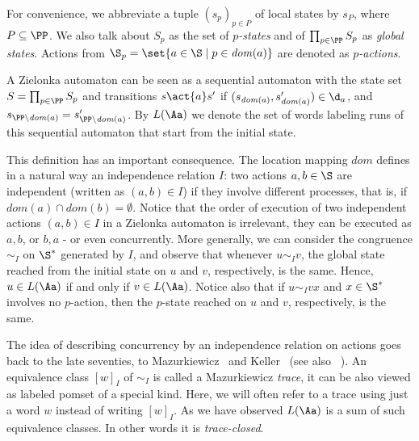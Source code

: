 \documentclass{llncs}
\newcommand{\loc}{\mathit{dom}}
\begin{document}
For convenience, we abbreviate a tuple $(s_p)_{p \in P}$ of local
states by  $s_P$,  where $P \subseteq \PP$. We also talk about $S_p$
as the set of \emph{$p$-states} and of $\prod_{p \in \PP} S_p$ as
\emph{global states}. Actions from $\S_p=\set{a \in\S \mid p
\in\loc(a)}$ are denoted as \emph{$p$-actions}.

A Zielonka automaton can be seen as a sequential automaton with the
state set $S = \prod_{p\in\PP} S_p$ and transitions $s \act{a} s'$ if
$(s_{\loc(a)}, s'_{\loc(a)}) \in \d_a$, and $s_{\PP\setminus
\loc(a)}=s'_{\PP\setminus \loc(a)}$. By $L(\Aa)$ we denote the set of
words labeling runs of this sequential automaton that start from the
initial state.


This definition has an important consequence. The location mapping
$\loc$ defines in a natural way an independence relation $I$: two
actions $a,b \in\S$ are independent (written as $(a,b)\in I$) if they
involve different processes, that is, if $\loc(a) \cap \loc(b)
=\emptyset$. Notice that the order of execution of two independent
actions $(a,b)\in I$ in a Zielonka automaton is irrelevant, they can
be executed as $a,b$, or $b,a$ - or even concurrently. More generally,
we can consider the congruence $\sim_I$ on $\S^*$ generated by $I$,
and observe that whenever $u \sim_I v$, the global state reached from
the initial state on $u$ and $v$, respectively, is the same. Hence, $u
\in L(\Aa)$ if and only if $v \in L(\Aa)$. Notice also that if $u
\sim_I vx$ and $x\in\S^*$ involves no $p$-action, then the $p$-state
reached on $u$ and $v$, respectively, is the same.



The idea of describing concurrency by an independence relation on
actions goes back to the late seventies, to Mazurkiewicz~\cite{maz77}
and Keller~\cite{kel73} (see also ~\cite{DieRoz95}). An equivalence
class $[w]_I$ of $\sim_I$ is called a Mazurkiewicz \emph{trace}, it can be
also viewed as labeled pomset of a special kind. Here, we will often
refer to a trace using just a word $w$ instead of writing $[w]_I$.  As
we have observed $L(\Aa)$ is a sum of such equivalence classes. In
other words it is \emph{trace-closed}.
\end{document}
